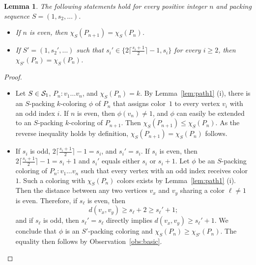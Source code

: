 \documentclass[12pt]{article}
\newtheorem{lemma}[theorem]{Lemma}
\newcommand{\cS}{{\cal S}}
\begin{document}
\begin{lemma} \label{lem:path2}
    The following statements hold for every positive integer $n$ and packing sequence $S=(1, s_2, \dots )$.
    \begin{itemize}
        \item[(i)] If $n$ is even, then $\chi_S(P_{n+1})=\chi_S(P_n)$.
        \item[(ii)] If $S'=(1, s_2', \dots )$ such that $s_i' \in \{2 \lceil \frac{s_i+1}{2}\rceil-1, s_i \}$ for every $i \ge 2$, then $\chi_{S'}(P_n)= \chi_S(P_n)$.
    \end{itemize}    
\end{lemma}
\begin{proof}  \begin{itemize}
        \item[(i)]
     Let $S \in \cS_1$, $P_n \colon v_1\dots v_n$, and $\chi_S(P_n)=k$. By Lemma~\ref{lem:path1} (i), there is an $S$-packing $k$-coloring $\phi$ of $P_n$ that assigns color~$1$ to every vertex $v_i$ with an odd index $i$. If $n$ is even, then $\phi(v_n) \neq 1$, and $\phi$ can easily be extended to an $S$-packing $k$-coloring of $P_{n+1}$. Then $\chi_S(P_{n+1}) \leq \chi_S(P_n)$. As the reverse inequality holds by definition, $\chi_S(P_{n+1})=\chi_S(P_n)$ follows.

   \item[(ii)] If $s_i$ is odd, $2 \lceil \frac{s_i+1}{2}\rceil-1=s_i$, and $s_i'=s_i$. If $s_i$ is even, then $2 \lceil \frac{s_i+1}{2}\rceil-1=s_i+1$ and $s_i'$ equals either $s_i$ or $s_i+1$. 
   Let $\phi$ be an $S$-packing coloring of $P_n \colon v_1\dots v_n$ such that every vertex with an odd index receives color~$1$. Such a coloring with $\chi_S(P_n)$ colors exists by Lemma~\ref{lem:path1} (i). Then the distance between any two vertices $v_x$ and $v_y$ sharing a color $\ell\neq 1$ is even. Therefore, if $s_\ell$ is even, then 
   $$d (v_x,v_y) \ge s_\ell +2  \ge s_\ell' +1; 
   $$
   and if $s_\ell$ is odd, then $s_\ell'=s_\ell$ directly implies $d (v_x,v_y)  \ge s_\ell' +1$. We conclude that $\phi$ is an $S'$-packing coloring and $\chi_S(P_n) \ge \chi_{S'}(P_n)$. The equality then follows by Observation~\ref{obs:basic}.
    \end{itemize}
\end{proof}

 
\end{document}
